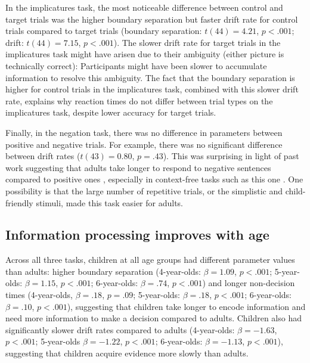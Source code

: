 \documentclass[10pt,letterpaper]{article}
\begin{document}
In the implicatures task, the most noticeable difference between control and target trials was the higher boundary separation but faster drift rate for control trials compared to target trials (boundary separation: $t(44) = 4.21$, $p< .001$; drift: $t(44) = 7.15$, $p< .001$). The slower drift rate for target trials in the implicatures task might have arisen due to their ambiguity (either picture is technically correct): Participants might have been slower to accumulate information to resolve this ambiguity. The fact that the boundary separation is higher for control trials in the implicatures task, combined with this slower drift rate, explains why reaction times do not differ between trial types on the implicatures task, despite lower accuracy for target trials.

Finally, in the negation task, there was no difference in parameters between positive and negative trials. For example, there was no significant difference between drift rates ($t(43) = 0.80$, $p = .43$). This was surprising in light of past work suggesting that adults take longer to respond to negative sentences compared to positive ones \cite{hclark1972}, especially in context-free tasks such as this one \cite{nordmeyer2014a}. One possibility is that the large number of repetitive trials, or the simplistic and child-friendly stimuli, made this task easier for adults.


\subsection{Information processing improves with age}


Across all three tasks, children at all age groups had different parameter values than adults: higher boundary separation (4-year-olds: $\beta = 1.09$, $p <.001$; 5-year-olds: $\beta = 1.15$, $p <.001$; 6-year-olds: $\beta = .74$, $p <.001$) and longer non-decision times (4-year-olds, $\beta = .18$, $p = .09$; 5-year-olds: $\beta = .18$, $p <.001$; 6-year-olds: $\beta = .10$, $p <.001$), suggesting that children take longer to encode information and need more information to make a decision compared to adults. Children also had significantly slower drift rates compared to adults (4-year-olds: $\beta = -1.63$, $p <.001$; 5-year-olds $\beta = -1.22$, $p <.001$; 6-year-olds: $\beta = -1.13$, $p <.001$), suggesting that children acquire evidence more slowly than adults.
\end{document}
